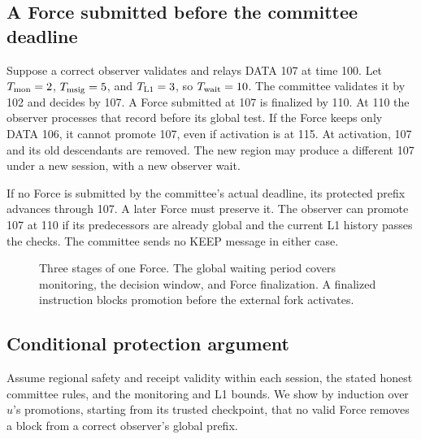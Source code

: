 \documentclass[11pt,a4paper]{article}
\newif\ifrevmarks
\newcommand{\Rv}[1]{\ifrevmarks\leavevmode{\color{rvBlue}#1}\else#1\fi}
\newcommand{\Cid}[1]{\ifrevmarks\textsuperscript{\hyperlink{chg:#1}{\color{rvBlue}\sffamily\scriptsize#1}}\fi}
\newcommand{\Twait}{T_{\rm wait}}
\begin{document}
\subsection{A Force submitted before the committee deadline}
Suppose a correct observer validates and relays DATA 107 at time 100.
Let $T_{\rm mon}=2$, $T_{\rm msig}=5$, and $T_{\rm L1}=3$, so
\Rv{$\Twait=10$}. The committee validates it by 102 and decides by 107.
A Force submitted at 107 is finalized by 110. At 110 the observer
processes that record before its global test. If the Force keeps only
DATA 106, it cannot promote 107, even if activation is at 115. At
activation, 107 and its old descendants are removed. The new region may
produce a different 107 under a new \Rv{session}, with a new observer
wait.

If no Force is submitted by the committee's actual deadline, its
protected prefix advances through 107. A later Force must preserve it.
The observer can promote 107 at 110 if its predecessors are already
global and the current L1 history passes the checks. The committee sends
no KEEP message in either case.

\begin{figure}[htbp]\centering
{}
\caption{Three stages of one Force. The global waiting period covers
monitoring, the decision window, and Force finalization. A finalized
instruction blocks promotion before the external fork activates.}
\label{fig:force-stages}
\end{figure}

\subsection{Conditional protection argument}
\label{sec:safety-argument}
Assume regional safety and receipt validity within each \Rv{session},
the stated honest committee rules, and the monitoring and L1 bounds.
\Rv{We show by induction over $u$'s promotions, starting from its
trusted checkpoint, that no valid Force removes a block from a correct
observer's global prefix.}
\end{document}
